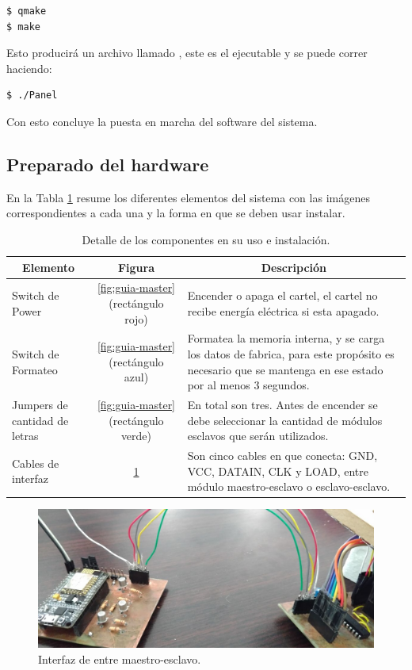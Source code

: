 \begin{lstlisting}
$ qmake
$ make
\end{lstlisting}

Esto producirá un archivo llamado , este es el ejecutable y se puede correr haciendo:

\begin{lstlisting}
$ ./Panel
\end{lstlisting}

Con esto concluye la puesta en marcha del software del sistema.

\subsection{Preparado del hardware}

En la Tabla \ref{table:uso-instalacion} resume los diferentes elementos del sistema con las imágenes correspondientes a cada una y la forma en que se deben usar instalar.

\begin{table}[ht!]
	\centering
	\caption{Detalle de los componentes en su uso e instalación.}
	\label{table:uso-instalacion}
	\begin{tabular}{lcp{}}
		\multicolumn{1}{c}{Elemento}	& Figura & \multicolumn{1}{c}{Descripción} \\ \hline
		Switch de Power         		& \ref{fig:guia-master} (rectángulo rojo)	& Encender o apaga el cartel, el cartel no recibe energía eléctrica si esta apagado. \\ \hline
		Switch de Formateo      		& \ref{fig:guia-master} (rectángulo azul)	& Formatea la memoria interna, y se carga los datos de fabrica, para este propósito es necesario que se mantenga en ese estado por al menos 3 segundos. \\ \hline
		Jumpers de cantidad de letras	& \ref{fig:guia-master} (rectángulo verde)	& En total son tres. Antes de encender se debe seleccionar la cantidad de módulos esclavos que serán utilizados. \\ \hline
		Cables de interfaz 				& \ref{fig:interfaz-master-slave}			& Son cinco cables en que conecta: GND, VCC, DATAIN, CLK y LOAD, entre módulo maestro-esclavo o esclavo-esclavo.
	\end{tabular}
\end{table}

\begin{figure}[!ht]
	\centering
	\includegraphics[width=\linewidth]{imagenes/guia/interfaz.jpeg}
	\caption{Interfaz de entre maestro-esclavo.}
	\label{fig:interfaz-master-slave}
\end{figure}

